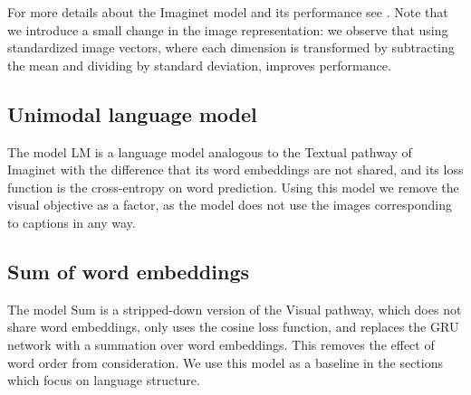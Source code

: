 \noindent
For more details about the {\sc Imaginet} model and its performance
see . Note that we introduce a small change in
the image representation: we observe that using standardized image
vectors, where each dimension is transformed by subtracting the mean
and dividing by standard deviation, improves performance.






\subsection{Unimodal language model}
The model {\sc LM} is a language model analogous to the {\sc Textual}
pathway of {\sc Imaginet} with the difference that its word embeddings
are not shared, and its loss function is the cross-entropy on word
prediction. Using this model we remove the visual objective as a
factor, as the model does not use the images corresponding to captions
in any way.

\subsection{Sum of word embeddings}
The model {\sc Sum} is a stripped-down version of the {\sc Visual}
pathway, which does not share word embeddings, only uses the cosine
loss function, and replaces the GRU network with a summation over word
embeddings. This removes the effect of word order from
consideration. We use this model as a baseline in the sections which
focus on language structure. 
